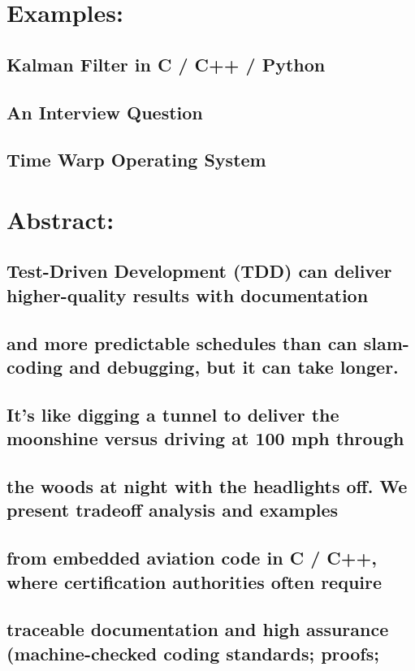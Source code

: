 \documentclass[10pt,oneside,x11names]{article}
\begin{document}
\section{Examples:}
\label{sec:org9ac94f5}
\subsection{Kalman Filter in C / C++ / Python}
\label{sec:org08e8093}
\subsection{An Interview Question}
\label{sec:org8aa6c62}
\subsection{Time Warp Operating System}
\label{sec:org88dc679}
\section{Abstract:}
\label{sec:org5e76212}
\subsection{Test-Driven Development (TDD) can deliver higher-quality results with documentation}
\label{sec:org0f25268}
\subsection{and more predictable schedules than can slam-coding and debugging, but it can take longer.}
\label{sec:orgec34d21}
\subsection{It's like digging a tunnel to deliver the moonshine versus driving at 100 mph through}
\label{sec:org88191e0}
\subsection{the woods at night with the headlights off. We present tradeoff analysis and examples}
\label{sec:orge49c3f8}
\subsection{from embedded aviation code in C / C++, where certification authorities often require}
\label{sec:orgb97fa4e}
\subsection{traceable documentation and high assurance (machine-checked coding standards; proofs;}
\label{sec:orgaf61aa1}
\end{document}
